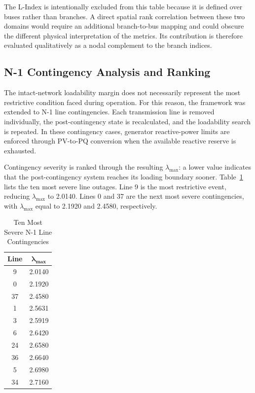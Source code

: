 \documentclass[conference]{IEEEtran}
\begin{document}
The L-Index is intentionally excluded from this table because it is defined over buses rather than branches. A direct spatial rank correlation between these two domains would require an additional branch-to-bus mapping and could obscure the different physical interpretation of the metrics. Its contribution is therefore evaluated qualitatively as a nodal complement to the branch indices.

\subsection{N-1 Contingency Analysis and Ranking}

The intact-network loadability margin does not necessarily represent the most restrictive condition faced during operation. For this reason, the framework was extended to N-1 line contingencies. Each transmission line is removed individually, the post-contingency state is recalculated, and the loadability search is repeated. In these contingency cases, generator reactive-power limits are enforced through PV-to-PQ conversion when the available reactive reserve is exhausted.

Contingency severity is ranked through the resulting $\lambda_{\max}$: a lower value indicates that the post-contingency system reaches its loading boundary sooner. Table~\ref{tab:n1_ranking} lists the ten most severe line outages. Line 9 is the most restrictive event, reducing $\lambda_{\max}$ to 2.0140. Lines 0 and 37 are the next most severe contingencies, with $\lambda_{\max}$ equal to 2.1920 and 2.4580, respectively.

\begin{table}[!t]
\centering
\caption{Ten Most Severe N-1 Line Contingencies}
\label{tab:n1_ranking}
\begin{tabular}{cc}
\toprule
\textbf{Line} & $\bm{\lambda_{\max}}$ \\
\midrule
9  & 2.0140 \\
0  & 2.1920 \\
37 & 2.4580 \\
1  & 2.5631 \\
3  & 2.5919 \\
6  & 2.6420 \\
24 & 2.6580 \\
36 & 2.6640 \\
5  & 2.6980 \\
34 & 2.7160 \\
\bottomrule
\end{tabular}
\end{table}
\end{document}
